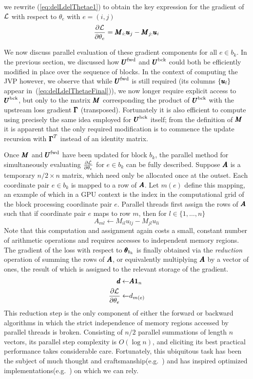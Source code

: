 \documentclass[superscriptaddress,floatfix]{article}
\begin{document}
we rewrite (\ref{eq:delLdelThetae1}) to obtain the key expression for
the gradient of $\mathcal{L}$ with respect to $\theta_e$ with $e = (i,j)$
\begin{align}
  \frac{\partial\mathcal{L}}{\partial\theta_e} = {\pmb{M}}_{i:}{\pmb{u}}_j -
  {\pmb{M}}_{j:}{\pmb{u}}_i
  \label{eq:delLdelThetaeFinal}
\end{align}

We now discuss parallel evaluation of these gradient components for
all $e \in b_k$. In the previous section, we discussed how ${\pmb{U}}^{\textrm{fwd}}$
and ${\pmb{U}}^{\textrm{bck}}$ could both be efficiently modified in place over the
sequence of blocks. In the context of computing the JVP however, we
observe that while ${\pmb{U}}^{\textrm{fwd}}$ is still required (its columns
$\{ {\pmb{u}}_l \}$ appear in~(\ref{eq:delLdelThetaeFinal})), we now longer
require explicit access to ${\pmb{U}}^{\textrm{bck}}$, but only to the matrix ${\pmb{M}}$
corresponding the product of ${\pmb{U}}^{\textrm{bck}}$ with the upstream loss
gradient ${\pmb{\Gamma}}$ (transposed). Fortunately it is also efficient to
compute using precisely the same idea employed for ${\pmb{U}}^{\textrm{bck}}$ itself;
from the definition of ${\pmb{M}}$ it is apparent that the only required
modification is to commence the update recursion with ${\pmb{\Gamma}}^T$
instead of an identity matrix.

Once ${\pmb{M}}$ and ${\pmb{U}}^{\textrm{fwd}}$ have been updated for block $b_k$, the
parallel method for simultaneously evaluating
$\frac{\partial\mathcal{L}}{\partial\theta_e}$ for $e \in b_k$ can be fully
described. Suppose ${\pmb{A}}$ is a temporary $n/2 \times n $ matrix, which
need only be allocated once at the outset. Each coordinate pair
$e \in b_k$ is mapped to a row of ${\pmb{A}}$. Let $m(e)$ define this
mapping, an example of which in a GPU context is the index in the
computational grid of the block processing coordinate pair $e$.
Parallel threads first assign the rows of ${\pmb{A}}$ such that if
coordinate pair $e$ maps to row $m$, then for $l \in \{1,\ldots,n\}$
\[
A_{ml} \gets M_{il}u_{lj} - M_{jl}u_{li}
\]
Note that this computation and assignment again costs a small,
constant number of arithmetic operations and requires accesses to
independent memory regions. The gradient of the loss with respect to
${\pmb{\theta}}_{b_k}$ is finally obtained via the \emph{reduction} operation
of summing the rows of ${\pmb{A}}$, or equivalently multiplying ${\pmb{A}}$ by a
vector of ones, the result of which is assigned to the relevant
storage of the gradient.
\begin{align}
  {\pmb{d}} \gets & {\pmb{A}}\mathbf{1}_n \nonumber \\
  \frac{\partial\mathcal{L}}{\partial\theta_e} \gets & d_{m(e)}
\end{align}
This reduction step is the only component of either the forward or
backward algorithms in which the strict independence of memory regions
accessed by parallel threads is broken. Consisting of $n/2$ parallel
summations of length $n$ vectors, its parallel step complexity is
$O(\log n)$, and eliciting its best practical performance takes
considerable care. Fortunately, this ubiquitous task has been the
subject of much thought and
craftsmanship(e.g.~\cite{harris2007optimizing}) and has inspired
optimized implementations(e.g.~\cite{cublas}) on which we can
rely.
\end{document}
